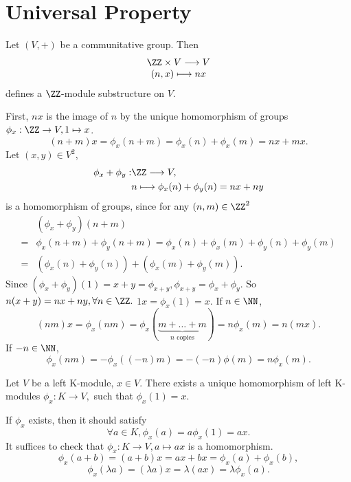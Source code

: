 \section{Universal Property}
\begin{propositionenv}
    Let $(V, +)$ be a communitative group. Then 
    $$\begin{matrix}
        \ZZ\times V\longrightarrow V\\
        (n, x)\longmapsto nx
    \end{matrix}$$
    defines a $\ZZ$-module substructure on $V$.
\end{propositionenv}
\begin{proofenv}
    First,  $nx$ is the image of $n$ by the unique homomorphism of groups $\phi_x:\ZZ\rightarrow V, 1\mapsto x$.
    $$(n+m)x=\phi_x(n+m)=\phi_x(n)+\phi_x(m)=nx+mx.$$
     Let $(x, y)\in V^2$, 
    \begin{align*}
        \phi_x+\phi_y:&\ZZ \longrightarrow V, \\
        &n\longmapsto \phi_x(n)+\phi_y(n)=nx+ny
    \end{align*}
    is a homomorphism of groups,  since for any $(n, m)\in \ZZ^2$
    \begin{align*}
        &(\phi_x+\phi_y)(n+m)\\
        =&\phi_x(n+m)+\phi_y(n+m)=\phi_x(n)+\phi_x(m)+\phi_y(n)+\phi_y(m)\\
        =&(\phi_x(n)+\phi_y(n))+(\phi_x(m)+\phi_y(m)).
    \end{align*}
    Since $(\phi_x+\phi_y)(1)=x+y=\phi_{x+y}, \phi_{x+y}=\phi_x+\phi_y.$ So $n(x+y)=nx+ny,  \forall n\in\ZZ.$ $1x=\phi_x(1)=x.$
    If $n\in \NN$, 
    $$(nm)x=\phi_x(nm)=\phi_x(\underset{n \text{ copies}}{\underbrace{m+\dots+m}})=n\phi_x(m)=n(mx).$$
    If $-n\in \NN$, 
    $$\phi_x(nm)=-\phi_x((-n)m)=-(-n)\phi(m)=n\phi_x(m).$$
\end{proofenv}
\begin{propositionenv}
    Let $V$ be a left K-module,  $x\in V$. There exists a unique homomorphism of left K-modules 
    $\phi_x:K\longrightarrow V, $
    such that $\phi_x(1)=x$.
\end{propositionenv}
\begin{proofenv}
    If $\phi_x$ exists,  then it should satisfy 
    $$\forall a\in K, \phi_x(a)=a\phi_x(1)=ax.$$
    It suffices to check that $\phi_x:K\rightarrow V, a\mapsto ax$ is a homomorphism.
    $$\phi_x(a+b)=(a+b)x=ax+bx=\phi_x(a)+\phi_x(b), $$
    $$\phi_x(\lambda a)=(\lambda a)x=\lambda(ax)=\lambda\phi_x(a).$$
\end{proofenv}
